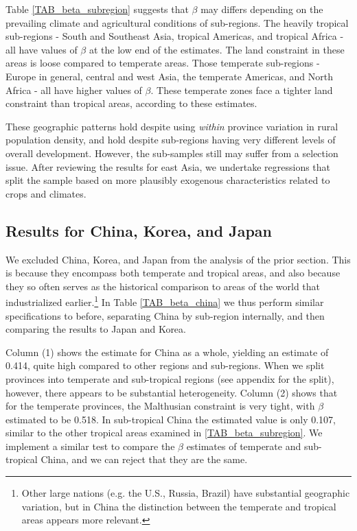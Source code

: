 \documentclass[11pt]{article}
\begin{document}
Table \ref{TAB_beta_subregion} suggests that $\beta$ may differs depending on the prevailing climate and agricultural conditions of sub-regions. The heavily tropical sub-regions - South and Southeast Asia, tropical Americas, and tropical Africa - all have values of $\beta$ at the low end of the estimates. The land constraint in these areas is loose compared to temperate areas. Those temperate sub-regions - Europe in general, central and west Asia, the temperate Americas, and North Africa - all have higher values of $\beta$. These temperate zones face a tighter land constraint than tropical areas, according to these estimates.

These geographic patterns hold despite using \textit{within} province variation in rural population density, and hold despite sub-regions having very different levels of overall development. However, the sub-samples still may suffer from a selection issue. After reviewing the results for east Asia, we undertake regressions that split the sample based on more plausibly exogenous characteristics related to crops and climates.

\subsection{Results for China, Korea, and Japan}
We excluded China, Korea, and Japan from the analysis of the prior section. This is because they encompass both temperate and tropical areas, and also because they so often serves as the historical comparison to areas of the world that industrialized earlier.\footnote{Other large nations (e.g. the U.S., Russia, Brazil) have substantial geographic variation, but in China the distinction between the temperate and tropical areas appears more relevant.} In Table \ref{TAB_beta_china} we thus perform similar specifications to before, separating China by sub-region internally, and then comparing the results to Japan and Korea. 

Column (1) shows the estimate for China as a whole, yielding an estimate of 0.414, quite high compared to other regions and sub-regions. When we split provinces into temperate and sub-tropical regions (see appendix for the split), however, there appears to be substantial heterogeneity. Column (2) shows that for the temperate provinces, the Malthusian constraint is very tight, with $\beta$ estimated to be 0.518. In sub-tropical China the estimated value is only 0.107, similar to the other tropical areas examined in \ref{TAB_beta_subregion}. We implement a similar test to compare the $\beta$ estimates of temperate and sub-tropical China, and we can reject that they are the same.
\end{document}
